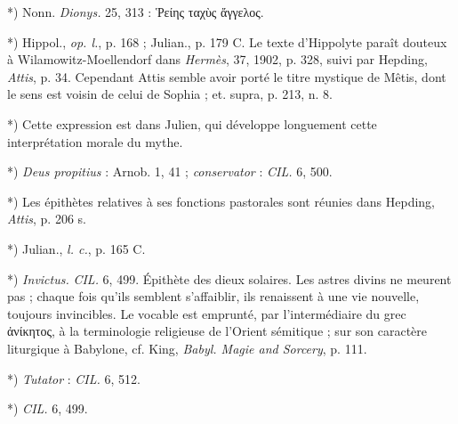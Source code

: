 \documentclass[a4paper, 11pt, oneside, polutonikogreek, french]{article}
\begin{document}
*) Nonn. \emph{Dionys.} 25, 313 : Ῥείης ταχὺς ἄγγελος.

*) Hippol., \emph{op. l.}, p. 168 ; Julian., p. 179 C. Le texte d'Hippolyte paraît douteux à Wilamowitz-Moellendorf dans \emph{Hermès}, 37, 1902, p. 328, suivi par Hepding, \emph{Attis}, p. 34. Cependant Attis semble avoir porté le titre mystique de Mêtis, dont le sens est voisin de celui de Sophia ; et. supra, p. 213, n. 8.

*) Cette expression est dans Julien, qui développe longuement cette interprétation morale du mythe.

*) \emph{Deus propitius} : Arnob. 1, 41 ; \emph{conservator} : \emph{CIL.} 6, 500.

*) Les épithètes relatives à ses fonctions pastorales sont réunies dans Hepding, \emph{Attis}, p. 206 s.

*) Julian., \emph{l. c.}, p. 165 C.

*) \emph{Invictus.} \emph{CIL.} 6, 499. Épithète des dieux solaires. Les astres divins ne meurent pas ; chaque fois qu'ils semblent s'affaiblir, ils renaissent à une vie nouvelle, toujours invincibles. Le vocable est emprunté, par l'intermédiaire du grec ἀνίκητος, à la terminologie religieuse de l'Orient sémitique ; sur son caractère liturgique à Babylone, cf. King, \emph{Babyl. Magie and Sorcery}, p. 111.

*) \emph{Tutator} : \emph{CIL.} 6, 512.

*) \emph{CIL.} 6, 499.
\end{document}
